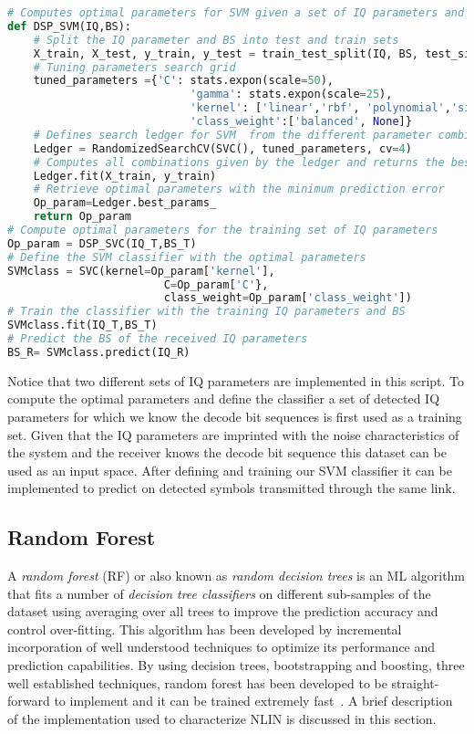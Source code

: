 \begin{lstlisting}[language=Python, caption={SVM implementation in python, where the optimal parameter are determined from a training dataset. With the optimal parameters the scheme can classify a new set of IQ parameters and determine the decode bit sequence.}]
# Computes optimal parameters for SVM given a set of IQ parameters and the decoded bit sequence(BS)
def DSP_SVM(IQ,BS):
	# Split the IQ parameter and BS into test and train sets
    X_train, X_test, y_train, y_test = train_test_split(IQ, BS, test_size = 0.20)
	# Tuning parameters search grid  
	tuned_parameters ={'C': stats.expon(scale=50),
							'gamma': stats.expon(scale=25),
							'kernel': ['linear','rbf', 'polynomial','sigmoid'],
							'class_weight':['balanced', None]}
	# Defines search ledger for SVM  from the different parameter combinations 
    Ledger = RandomizedSearchCV(SVC(), tuned_parameters, cv=4)
	# Computes all combinations given by the ledger and returns the best performing parameters
    Ledger.fit(X_train, y_train)
	# Retrieve optimal parameters with the minimum prediction error 
    Op_param=Ledger.best_params_
    return Op_param
# Compute optimal parameters for the training set of IQ parameters
Op_param = DSP_SVC(IQ_T,BS_T)
# Define the SVM classifier with the optimal parameters
SVMclass = SVC(kernel=Op_param['kernel'],
    					C=Op_param['C'},
    					class_weight=Op_param['class_weight'])
# Train the classifier with the training IQ parameters and BS      
SVMclass.fit(IQ_T,BS_T)
# Predict the BS of the received IQ parameters
BS_R= SVMclass.predict(IQ_R)
\end{lstlisting}
 Notice that two different sets of IQ parameters are implemented in this script. To compute the optimal parameters and define the classifier a set of detected IQ parameters for which we know the decode bit sequences is first used as a training set. Given that the IQ parameters are imprinted with the noise  characteristics of the system and the receiver knows the decode bit sequence this dataset can be used as an input space. After defining and training our SVM classifier it can be implemented to predict on detected symbols transmitted through the same link. 
\subsection{Random Forest}

A \textit{random forest} (RF) or also known as \textit{random decision trees} is an ML algorithm that fits a number of \textit{decision tree classifiers} on different sub-samples of the dataset using averaging over all trees to improve the prediction accuracy and control over-fitting. This algorithm has been developed by incremental incorporation of well understood techniques to optimize its performance and prediction capabilities. By using decision trees, bootstrapping and boosting, three well established techniques, random forest has been developed to be straight-forward to implement and it can be trained extremely fast~\cite{ho1995random}. A brief description of the implementation used to characterize NLIN is discussed in this section.
 
